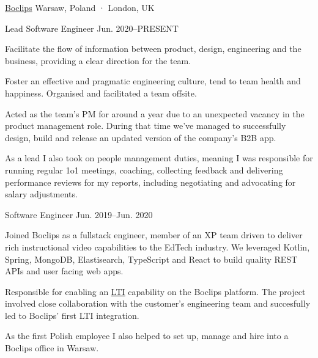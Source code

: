 
\begin{cventries}

  \multicventry
    {\href{https://www.boclips.com}{Boclips}} %
    {Warsaw, Poland · London, UK} %
    {
      \multicventryitem
        {Lead Software Engineer} %
        {Jun. 2020–PRESENT} %
        {
          \begin{cvitems} %
            \item {Facilitate the flow of information between product, design, engineering and the business, providing a clear direction for the team.}
            \item {Foster an effective and pragmatic engineering culture, tend to team health and happiness. Organised and facilitated a team offsite.}
            \item {Acted as the team's PM for around a year due to an unexpected vacancy in the product management role. During that time we've managed to successfully design, build and release an updated version of the company's B2B app.}
            \item {As a lead I also took on people management duties, meaning I was responsible for running regular 1o1 meetings, coaching, collecting feedback and delivering performance reviews for my reports, including negotiating and advocating for salary adjustments.}
          \end{cvitems}
        }
      \multicventryitem
        {Software Engineer} %
        {Jun. 2019–Jun. 2020} %
        {
          \begin{cvitems} %
            \item {Joined Boclips as a fullstack engineer, member of an XP team driven to deliver rich instructional video capabilities to the EdTech industry. We leveraged Kotlin, Spring, MongoDB, Elastisearch, TypeScript and React to build quality REST APIs and user facing web apps.}
            \item {Responsible for enabling an \href{https://www.imsglobal.org/activity/learning-tools-interoperability}{\underline{LTI}} capability on the Boclips platform. The project involved close collaboration with the customer's engineering team and succesfully led to Boclips' first LTI integration.}
            \item {As the first Polish employee I also helped to set up, manage and hire into a Boclips office in Warsaw.}
          \end{cvitems}
        }
    }


\end{cventries}

